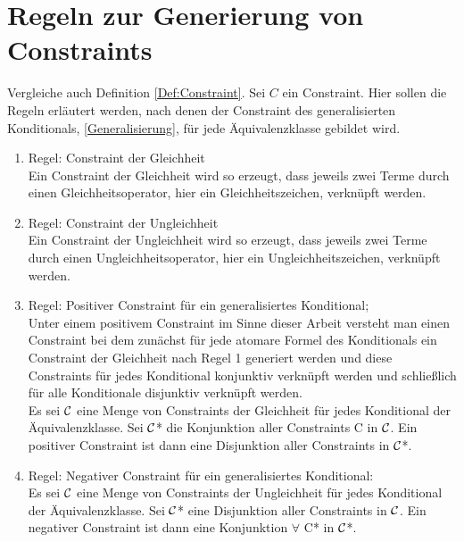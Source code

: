\documentclass[draft]{scrreprt}
\begin{document}
\section{Regeln zur Generierung von Constraints}\label{Reg} 
Vergleiche auch Definition \ref{Def:Constraint}.
Sei $ C $ ein Constraint. Hier sollen die Regeln erläutert werden, nach denen der Constraint des generalisierten Konditionals, \ref{Generalisierung}, für jede Äquivalenzklasse gebildet wird.  
\begin{enumerate}
	\item \label{Reg1} Regel: Constraint der Gleichheit\\
	Ein Constraint der Gleichheit wird so erzeugt, dass jeweils zwei Terme durch einen Gleichheitsoperator, hier ein Gleichheitszeichen, verknüpft werden.
	
	\item \label{Reg2} Regel: Constraint der Ungleichheit\\
		Ein Constraint der Ungleichheit wird so erzeugt, dass jeweils zwei Terme durch einen Ungleichheitsoperator, hier ein Ungleichheitszeichen, verknüpft werden.
	
	\item \label{Reg3} Regel: Positiver Constraint für ein generalisiertes Konditional;\\
	Unter einem positivem Constraint im Sinne dieser Arbeit versteht man einen Constraint bei dem zunächst für jede atomare Formel des Konditionals ein Constraint der Gleichheit nach Regel 1 generiert werden und diese Constraints für jedes Konditional konjunktiv verknüpft werden und schließlich für alle Konditionale disjunktiv verknüpft werden.\\
	Es sei $ \cal {C} $ eine Menge von Constraints der Gleichheit für jedes Konditional der Äquivalenzklasse. Sei $ \cal{C} $* die Konjunktion aller Constraints  C in $\cal {C}  $. Ein positiver Constraint ist dann eine Disjunktion aller Constraints in $ \cal{C} $*.
	
	\item \label{Reg4} Regel: Negativer Constraint für ein generalisiertes Konditional:\\
		Es sei $ \cal {C} $ eine Menge von Constraints der Ungleichheit für jedes Konditional der Äquivalenzklasse. Sei $ \cal{C} $* eine Disjunktion aller Constraints in $\cal {C}  $. Ein negativer Constraint ist dann eine Konjunktion $ \forall $ C* in $ \cal{C} $*.
	
	
	
\end{enumerate}
\end{document}
